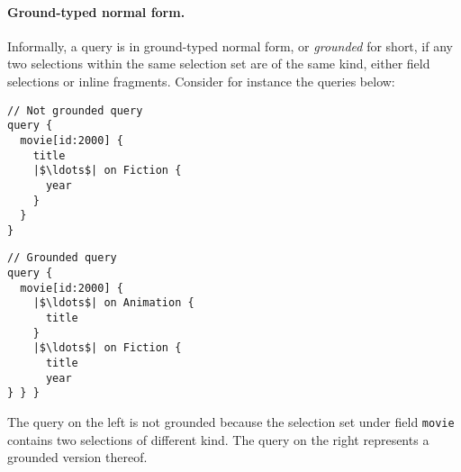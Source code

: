 
\paragraph{Ground-typed normal form.}
Informally, a query is in ground-typed normal form, or {\em grounded}
for short, if %
any two selections within the same selection set are of the same kind,
either field selections or inline fragments. 
Consider for instance the queries below:

\smallskip

\begin{minipage}[t]{.25\textwidth}
\begin{verbatim}
// Not grounded query
query {
  movie[id:2000] {
    title
    |$\ldots$| on Fiction {
	  year
    }
  }
}
\end{verbatim}
\end{minipage}%
\begin{minipage}[t]{.25\textwidth}
\begin{verbatim}
// Grounded query
query {
  movie[id:2000] {
    |$\ldots$| on Animation {
      title
    }
    |$\ldots$| on Fiction {
      title
      year
} } }
\end{verbatim} 
\end{minipage}

\smallskip

\noindent The query on the left is not grounded because the selection
set under field \texttt{movie} contains two selections of different
kind. The query on the right represents a grounded version thereof. %

